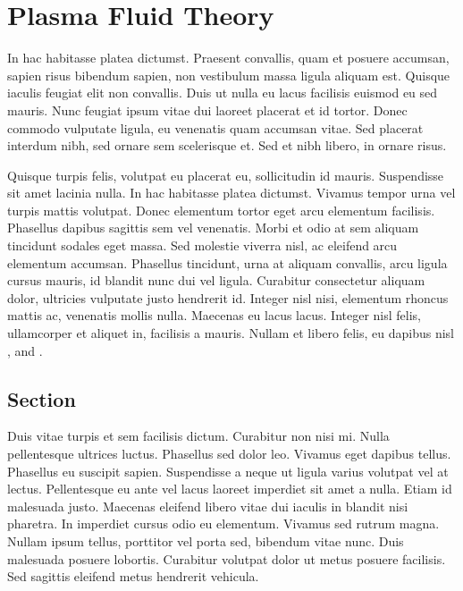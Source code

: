 \chapter{Plasma Fluid Theory}



In hac habitasse platea dictumst. Praesent convallis, quam et posuere accumsan, sapien risus bibendum sapien, non vestibulum massa ligula aliquam est. Quisque iaculis feugiat elit non convallis. Duis ut nulla eu lacus facilisis euismod eu sed mauris. Nunc feugiat ipsum vitae dui laoreet placerat et id tortor. Donec commodo vulputate ligula, eu venenatis quam accumsan vitae. Sed placerat interdum nibh, sed ornare sem scelerisque et. Sed et nibh libero, in ornare risus. 

Quisque turpis felis, volutpat eu placerat eu, sollicitudin id mauris. Suspendisse sit amet lacinia nulla. In hac habitasse platea dictumst. Vivamus tempor urna vel turpis mattis volutpat. Donec elementum tortor eget arcu elementum facilisis. Phasellus dapibus sagittis sem vel venenatis. Morbi et odio at sem aliquam tincidunt sodales eget massa. Sed molestie viverra nisl, ac eleifend arcu elementum accumsan. Phasellus tincidunt, urna at aliquam convallis, arcu ligula cursus mauris, id blandit nunc dui vel ligula. Curabitur consectetur aliquam dolor, ultricies vulputate justo hendrerit id. Integer nisl nisi, elementum rhoncus mattis ac, venenatis mollis nulla. Maecenas eu lacus lacus. Integer nisl felis, ullamcorper et aliquet in, facilisis a mauris. Nullam et libero felis, eu dapibus nisl \cite{Chang2000qy},\cite{Sankar2004uq} and \cite{diamantaras1996pcn}.

\section{Section}
Duis vitae turpis et sem facilisis dictum. Curabitur non nisi mi. Nulla pellentesque ultrices luctus. Phasellus sed dolor leo. Vivamus eget dapibus tellus. Phasellus eu suscipit sapien. Suspendisse a neque ut ligula varius volutpat vel at lectus. Pellentesque eu ante vel lacus laoreet imperdiet sit amet a nulla. Etiam id malesuada justo. Maecenas eleifend libero vitae dui iaculis in blandit nisi pharetra. In imperdiet cursus odio eu elementum. Vivamus sed rutrum magna. Nullam ipsum tellus, porttitor vel porta sed, bibendum vitae nunc. Duis malesuada posuere lobortis. Curabitur volutpat dolor ut metus posuere facilisis. Sed sagittis eleifend metus hendrerit vehicula. 

